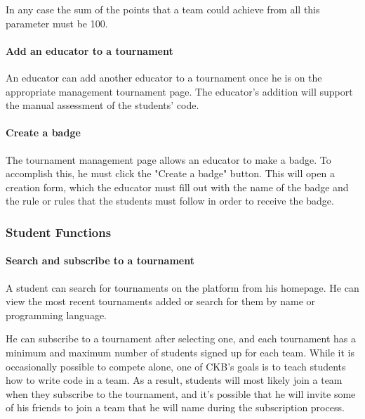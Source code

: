 In any case the sum of the points that a team could achieve from all this parameter must be 100.

\paragraph{Add an educator to a tournament}
An educator can add another educator to a tournament once he is on the appropriate management tournament page. The educator's addition will support the manual assessment of the students' code.

\paragraph{Create a badge}
The tournament management page allows an educator to make a badge. To accomplish this, he must click the "Create a badge" button. This will open a creation form, which the educator must fill out with the name of the badge and the rule 
or rules that the students must follow in order to receive the badge.

\subsubsection{Student Functions}

\paragraph{Search and subscribe to a tournament}
A student can search for tournaments on the platform from his homepage. He can view the most recent tournaments added or search for them by name or programming language.

He can subscribe to a tournament after selecting one, and each tournament has a minimum and maximum number of students signed up for each team. While it is occasionally possible to compete alone, one of CKB's goals is to teach 
students how to write code in a team. As a result, students will most likely join a team when they subscribe to the tournament, and it's possible that he will invite some of his friends to join a team that he will name during the 
subscription process.

